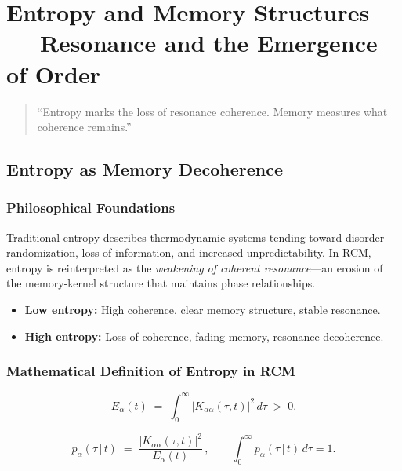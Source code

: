 \chapter{Entropy and Memory Structures — Resonance and the Emergence of Order}


\begin{quote}
``Entropy marks the loss of resonance coherence.  Memory measures what coherence remains.''
\end{quote}

\section{Entropy as Memory Decoherence}

\subsection{Philosophical Foundations}

Traditional entropy describes thermodynamic systems tending toward disorder—randomization, loss of information, and increased unpredictability.  In RCM, entropy is reinterpreted as the \emph{weakening of coherent resonance}—an erosion of the memory‐kernel structure that maintains phase relationships.

\begin{itemize}
  \item \textbf{Low entropy:} High coherence, clear memory structure, stable resonance.
  \item \textbf{High entropy:} Loss of coherence, fading memory, resonance decoherence.
\end{itemize}

\subsection{Mathematical Definition of Entropy in RCM}

\begin{equation}
  E_{\alpha}(t) \;=\; \int_{0}^{\infty}\!\bigl|K_{\alpha\alpha}(\tau,t)\bigr|^{2}\,d\tau \;>\; 0.
\end{equation}

\begin{equation}
  p_{\alpha}(\tau\,|\,t) \;=\; \frac{|K_{\alpha\alpha}(\tau,t)|^{2}}{E_{\alpha}(t)}\,,
  \qquad \int_{0}^{\infty} p_{\alpha}(\tau\,|\,t)\,d\tau = 1.
\end{equation}

